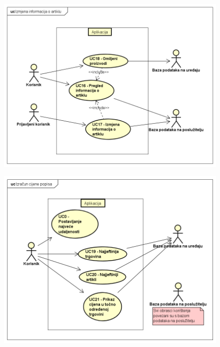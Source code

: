 			    \begin{figure}[H]
			        \begin{center}
		            \includegraphics[width=.9\linewidth]{dijagrami/uc_info_artikl.png}
		            \label{fig:uc_info_artikl}
	                \end{center}
	            \end{figure}		
			    \begin{figure}[H]
			        \begin{center}
		            \includegraphics[width=.9\linewidth]{dijagrami/uc_cijena_popisa.png}
		            \label{fig:uc_cijena_popisa}
	                \end{center}
	            \end{figure}		
